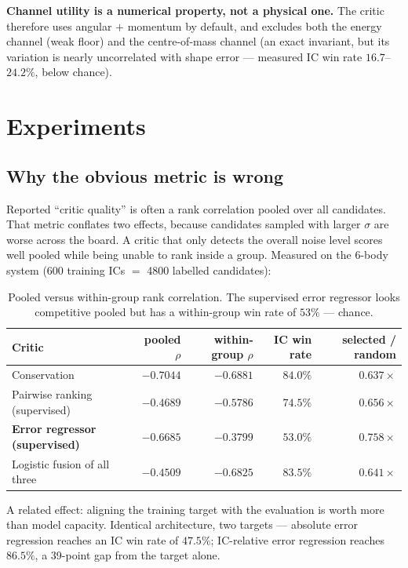 \documentclass[11pt]{article}
\begin{document}
\textbf{Channel utility is a numerical property, not a physical one.} The critic
therefore uses angular $+$ momentum by default, and excludes both the energy channel
(weak floor) and the centre-of-mass channel (an exact invariant, but its variation is
nearly uncorrelated with shape error --- measured IC win rate $16.7$--$24.2\%$, below
chance).

\section{Experiments}
\label{sec:experiments}

\subsection{Why the obvious metric is wrong}
\label{sec:metric}

Reported ``critic quality'' is often a rank correlation pooled over all candidates. That
metric conflates two effects, because candidates sampled with larger $\sigma$ are worse
across the board. A critic that only detects the overall noise level scores well pooled
while being unable to rank inside a group. Measured on the 6-body system (600 training
ICs $=$ 4800 labelled candidates):

\begin{table}[t]
\centering
\small
\caption{Pooled versus within-group rank correlation. The supervised error regressor
looks competitive pooled but has a within-group win rate of $53\%$ --- chance.}
\label{tab:pooled}
\begin{tabular}{lrrrr}
\toprule
Critic & pooled $\rho$ & \textbf{within-group $\rho$} & \textbf{IC win rate} & selected / random \\
\midrule
Conservation & $-0.7044$ & $\mathbf{-0.6881}$ & $\mathbf{84.0\%}$ & $\mathbf{0.637\times}$ \\
Pairwise ranking (supervised) & $-0.4689$ & $-0.5786$ & $74.5\%$ & $0.656\times$ \\
\textbf{Error regressor (supervised)} & $\mathbf{-0.6685}$ & $\mathbf{-0.3799}$ & $\mathbf{53.0\%}$ & $0.758\times$ \\
Logistic fusion of all three & $-0.4509$ & $-0.6825$ & $83.5\%$ & $0.641\times$ \\
\bottomrule
\end{tabular}
\end{table}

A related effect: aligning the training target with the evaluation is worth more than
model capacity. Identical architecture, two targets --- absolute error regression
reaches an IC win rate of $\mathbf{47.5\%}$; IC-relative error regression reaches
$\mathbf{86.5\%}$, a 39-point gap from the target alone.
\end{document}
